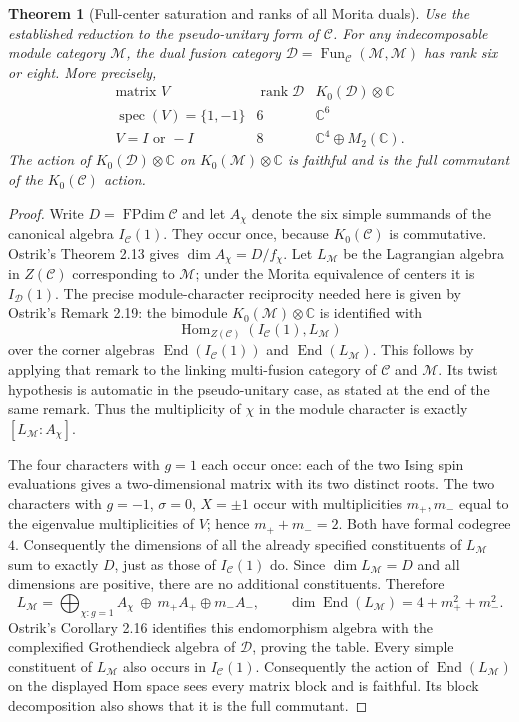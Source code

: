 \documentclass[11pt]{article}
\newtheorem{theorem}{Theorem}\newtheorem{lemma}{Lemma}\newtheorem{corollary}{Corollary}
\newcommand{\C}{\mathcal C}\newcommand{\I}{\mathcal I}\newcommand{\M}{\mathcal M}
\newcommand{\FPdim}{\operatorname{FPdim}}
\begin{document}
\begin{theorem}[Full-center saturation and ranks of all Morita duals]
Use the established reduction to the pseudo-unitary form of $\C$.
For any indecomposable module category $\M$, the dual fusion category
$\mathcal D=\operatorname{Fun}_{\C}(\M,\M)$ has rank six or eight.
More precisely,
\[
\begin{array}{c|c|c}
\text{matrix }V&\operatorname{rank}\mathcal D&
K_0(\mathcal D)\otimes\mathbb C\\\hline
\operatorname{spec}(V)=\{1,-1\}&6&\mathbb C^6\\
V=I\text{ or }-I&8&\mathbb C^4\oplus M_2(\mathbb C).
\end{array}
\]
The action of $K_0(\mathcal D)\otimes\mathbb C$ on
$K_0(\M)\otimes\mathbb C$ is faithful and is the full commutant of
the $K_0(\C)$ action.
\end{theorem}
\begin{proof}
Write $D=\FPdim\C$ and let $A_\chi$ denote the six simple summands
of the canonical algebra $I_{\C}(1)$. They occur once, because
$K_0(\C)$ is commutative. Ostrik's Theorem 2.13 gives
$\dim A_\chi=D/f_\chi$.
Let $L_\M$ be the Lagrangian algebra in $Z(\C)$ corresponding to
$\M$; under the Morita equivalence of centers it is $I_{\mathcal D}(1)$.
The precise module-character reciprocity needed here is given by
Ostrik's Remark 2.19: the bimodule $K_0(\M)\otimes\mathbb C$ is
identified with
\[
\operatorname{Hom}_{Z(\C)}(I_{\C}(1),L_\M)
\]
over the corner algebras $\operatorname{End}(I_{\C}(1))$ and
$\operatorname{End}(L_\M)$. This follows by applying that remark to
the linking multi-fusion category of $\C$ and $\M$.
Its twist hypothesis is automatic in the pseudo-unitary case, as stated
at the end of the same remark. Thus the multiplicity of $\chi$ in the
module character is exactly $[L_\M:A_\chi]$.

The four characters with $g=1$ each occur once: each of the two Ising
spin evaluations gives a two-dimensional matrix with its two distinct
roots. The two characters with $g=-1$, $\sigma=0$, $X=\pm1$ occur
with multiplicities $m_+,m_-$ equal to the eigenvalue multiplicities of
$V$; hence $m_++m_-=2$. Both have formal codegree $4$. Consequently
the dimensions of all the already specified constituents of $L_\M$ sum
to exactly $D$, just as those of $I_{\C}(1)$ do. Since
$\dim L_\M=D$ and all dimensions are positive, there are no additional
constituents. Therefore
\[
L_\M=\bigoplus_{\chi:g=1}A_\chi\ \oplus\ m_+A_+\oplus m_-A_-,
\qquad
\dim\operatorname{End}(L_\M)=4+m_+^2+m_-^2.
\]
Ostrik's Corollary 2.16 identifies this endomorphism algebra with the
complexified Grothendieck algebra of $\mathcal D$, proving the table.
Every simple constituent of $L_\M$ also occurs in $I_{\C}(1)$.
Consequently the action of $\operatorname{End}(L_\M)$ on the displayed
Hom space sees every matrix block and is faithful. Its block
decomposition also shows that it is the full commutant.
\end{proof}
\end{document}
